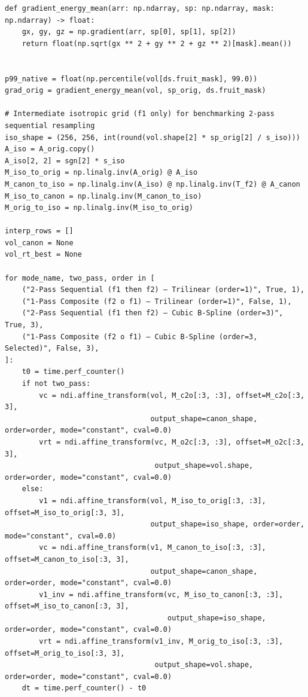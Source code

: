 \documentclass[10pt,a4paper]{article}
\renewcommand{\_}{\origunderscore\allowbreak}
\begin{document}
\begin{codebox}
\begin{lstlisting}[style=pybmed]
def gradient_energy_mean(arr: np.ndarray, sp: np.ndarray, mask: np.ndarray) -> float:
    gx, gy, gz = np.gradient(arr, sp[0], sp[1], sp[2])
    return float(np.sqrt(gx ** 2 + gy ** 2 + gz ** 2)[mask].mean())


p99_native = float(np.percentile(vol[ds.fruit_mask], 99.0))
grad_orig = gradient_energy_mean(vol, sp_orig, ds.fruit_mask)

# Intermediate isotropic grid (f1 only) for benchmarking 2-pass sequential resampling
iso_shape = (256, 256, int(round(vol.shape[2] * sp_orig[2] / s_iso)))
A_iso = A_orig.copy()
A_iso[2, 2] = sgn[2] * s_iso
M_iso_to_orig = np.linalg.inv(A_orig) @ A_iso
M_canon_to_iso = np.linalg.inv(A_iso) @ np.linalg.inv(T_f2) @ A_canon
M_iso_to_canon = np.linalg.inv(M_canon_to_iso)
M_orig_to_iso = np.linalg.inv(M_iso_to_orig)

interp_rows = []
vol_canon = None
vol_rt_best = None

for mode_name, two_pass, order in [
    ("2-Pass Sequential (f1 then f2) — Trilinear (order=1)", True, 1),
    ("1-Pass Composite (f2 o f1) — Trilinear (order=1)", False, 1),
    ("2-Pass Sequential (f1 then f2) — Cubic B-Spline (order=3)", True, 3),
    ("1-Pass Composite (f2 o f1) — Cubic B-Spline (order=3, Selected)", False, 3),
]:
    t0 = time.perf_counter()
    if not two_pass:
        vc = ndi.affine_transform(vol, M_c2o[:3, :3], offset=M_c2o[:3, 3],
                                  output_shape=canon_shape, order=order, mode="constant", cval=0.0)
        vrt = ndi.affine_transform(vc, M_o2c[:3, :3], offset=M_o2c[:3, 3],
                                   output_shape=vol.shape, order=order, mode="constant", cval=0.0)
    else:
        v1 = ndi.affine_transform(vol, M_iso_to_orig[:3, :3], offset=M_iso_to_orig[:3, 3],
                                  output_shape=iso_shape, order=order, mode="constant", cval=0.0)
        vc = ndi.affine_transform(v1, M_canon_to_iso[:3, :3], offset=M_canon_to_iso[:3, 3],
                                  output_shape=canon_shape, order=order, mode="constant", cval=0.0)
        v1_inv = ndi.affine_transform(vc, M_iso_to_canon[:3, :3], offset=M_iso_to_canon[:3, 3],
                                      output_shape=iso_shape, order=order, mode="constant", cval=0.0)
        vrt = ndi.affine_transform(v1_inv, M_orig_to_iso[:3, :3], offset=M_orig_to_iso[:3, 3],
                                   output_shape=vol.shape, order=order, mode="constant", cval=0.0)
    dt = time.perf_counter() - t0


\end{lstlisting}
\end{codebox}
\end{document}
